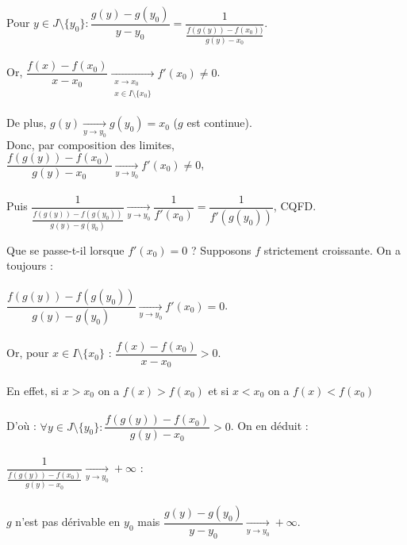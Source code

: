 \documentclass[12pt,a4paper]{report}
\begin{document}
\begin{demo}{}
Pour $y \in J \setminus \{y_0 \} : \dfrac{g(y)-g(y_0)}{y-y_0} = \dfrac{1}{\frac{f(g(y))-f(x_0))}{g(y)-x_0}}$. \\ \\
Or, $\dfrac{f(x)-f(x_0)}{x-x_0} \xrightarrow[\substack{x \to x_0 \\ x \in I \setminus \{x_0\}}]{} f'(x_0) \neq 0$. \\ \\
De plus, $g(y) \xrightarrow[y \to y_0]{} g(y_0) = x_0$ ($g$ est continue). \\
Donc, par composition des limites, \\
$\dfrac{f(g(y))-f(x_0)}{g(y)-x_0} \xrightarrow[y \to y_0]{} f'(x_0) \neq 0$, \\ \\
Puis $\dfrac{1}{\frac{f(g(y))-f(g(y_0))}{g(y)-g(y_0)}} \xrightarrow[y \to y_0]{} \dfrac{1}{f'(x_0)}=\dfrac{1}{f'(g(y_0))}$, CQFD.
\end{demo}

\begin{remarque}
Que se passe-t-il lorsque $f'(x_0)=0$ ? Supposons $f$ strictement croissante. On a toujours : \\ \\
$\dfrac{f(g(y))-f(g(y_0))}{g(y)-g(y_0)} \xrightarrow[y \to y_0]{} f'(x_0) = 0$. \\ \\
Or, pour $x \in I \setminus \{x_0\}$ : $\dfrac{f(x)-f(x_0)}{x-x_0}>0$. \\ \\
En effet, si $x>x_0$ on a $f(x)>f(x_0)$ et si $x<x_0$ on a $f(x)<f(x_0)$ \\ \\
D'où : $\forall y \in J \setminus \{y_0\} : \dfrac{f(g(y))-f(x_0)}{g(y)-x_0} > 0$. On en déduit : \\ \\
$\dfrac{1}{\frac{f(g(y))-f(x_0)}{g(y)-x_0}} \xrightarrow[y \to y_0]{} +\infty$ : \\ \\
$g$ n'est pas dérivable en $y_0$ mais $\dfrac{g(y)-g(y_0)}{y-y_0} \xrightarrow[y \to y_0]{} +\infty$.
\end{remarque}
\end{document}
